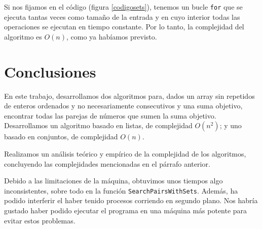 \documentclass[a4paper, titlepage]{article}
\begin{document}
Si nos fijamos en el código (figura \ref{codigosets}), tenemos un bucle \texttt{for} que se ejecuta tantas veces como tamaño de la entrada y en cuyo interior todas las operaciones se ejecutan en tiempo constante. Por lo tanto, la complejidad del algoritmo es $O(n)$, como ya habíamos previsto.

\section{Conclusiones}

En este trabajo, desarrollamos dos algoritmos para, dados un array sin repetidos de enteros ordenados y no necesariamente consecutivos y una suma objetivo, encontrar todas las parejas de números que sumen la suma objetivo. Desarrollamos un algoritmo basado en listas, de complejidad $O(n^2)$; y uno basado en conjuntos, de complejidad $O(n)$.

Realizamos un análisis teórico y empírico de la complejidad de los algoritmos, concluyendo las complejidades mencionadas en el párrafo anterior.

Debido a las limitaciones de la máquina, obtuvimos unos tiempos algo inconsistentes, sobre todo en la función \texttt{SearchPairsWithSets}. Además, ha podido interferir el haber tenido procesos corriendo en segundo plano. Nos habría gustado haber podido ejecutar el programa en una máquina más potente para evitar estos problemas.




\end{document}
